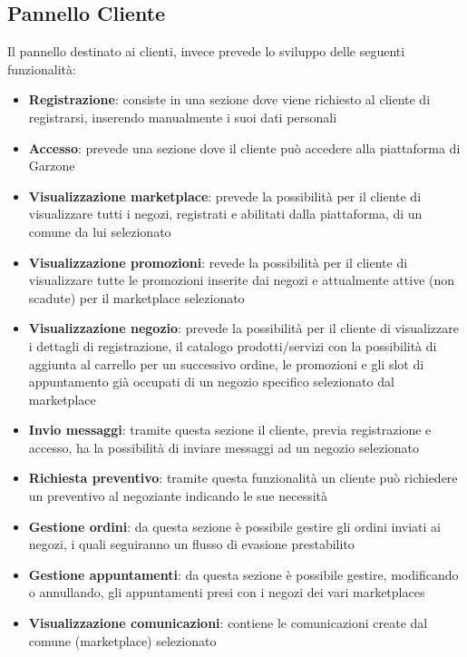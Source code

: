 \subsection{Pannello Cliente} Il pannello destinato ai clienti, invece prevede lo sviluppo delle seguenti funzionalità:
\begin{itemize}
    \item \textbf{Registrazione}: consiste in una sezione dove viene richiesto al cliente di registrarsi, inserendo manualmente i suoi dati personali
    \item \textbf{Accesso}: prevede una sezione dove il cliente può accedere alla piattaforma di Garzone
    \item \textbf{Visualizzazione marketplace}: prevede la possibilità per il cliente di visualizzare tutti i negozi, registrati e abilitati dalla piattaforma, di un comune da lui selezionato
    \item \textbf{Visualizzazione promozioni}: revede la possibilità per il cliente di visualizzare tutte le promozioni inserite dai negozi  e attualmente attive (non scadute) per il marketplace selezionato
    \item \textbf{Visualizzazione negozio}: prevede la possibilità per il cliente di visualizzare i dettagli di registrazione, il catalogo prodotti/servizi con la possibilità di aggiunta al carrello per un successivo ordine, le promozioni e gli slot di appuntamento già occupati di un negozio specifico selezionato dal marketplace
    \item \textbf{Invio messaggi}: tramite questa sezione il cliente, previa registrazione e accesso, ha la possibilità di inviare messaggi ad un negozio selezionato
    \item \textbf{Richiesta preventivo}: tramite questa funzionalità un cliente può richiedere un preventivo al negoziante indicando le sue necessità
    \item \textbf{Gestione ordini}: da questa sezione è possibile gestire gli ordini inviati ai negozi, i quali seguiranno un flusso di evasione prestabilito
    \item \textbf{Gestione appuntamenti}: da questa sezione è possibile gestire, modificando o annullando, gli appuntamenti presi con i negozi dei vari marketplaces
    \item \textbf{Visualizzazione comunicazioni}: contiene le comunicazioni create dal comune (marketplace) selezionato
\end{itemize}

